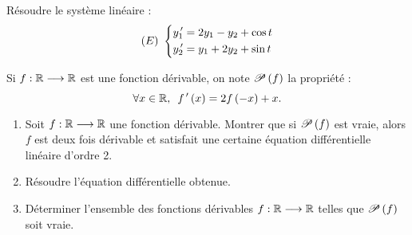 \begin{corr}
\end{corr}

\begin{exo}[Exercice 16]
Résoudre le système linéaire : \[\paren{E}~\begin{dcases}
y_1\prim=2y_1-y_2+\cos t \\
y_2\prim=y_1+2y_2+\sin t
\end{dcases}\]
\end{exo}

\begin{corr}
\end{corr}

\begin{exo}[Exercice 17]
Si \(f:\R\to\R\) est une fonction dérivable, on note \(\P{f}\) la propriété : \[\quantifs{\forall x\in\R}f\prim\paren{x}=2f\paren{-x}+x.\]

\begin{enumerate}
    \item Soit \(f:\R\to\R\) une fonction dérivable. Montrer que si \(\P{f}\) est vraie, alors \(f\) est deux fois dérivable et satisfait une certaine équation différentielle linéaire d'ordre 2. \\
    \item Résoudre l'équation différentielle obtenue. \\
    \item Déterminer l'ensemble des fonctions dérivables \(f:\R\to\R\) telles que \(\P{f}\) soit vraie.
\end{enumerate}
\end{exo}

\begin{corr}
\end{corr}